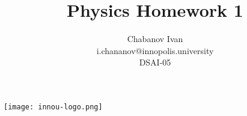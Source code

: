 
\begin{titlepage}

    \centering\texttt{[image: innou-logo.png]}
    
    \vspace{20mm}
    \title{Physics Homework 1}
    \author{Chabanov Ivan\\i.chananov@innopolis.university\\DSAI-05}
    \maketitle

\end{titlepage}